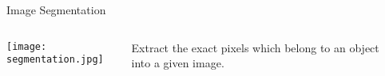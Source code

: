 \documentclass{standalone}
\begin{document}
\begin{frame}
\begin{columns}
\begin{column}{0.5\textwidth}
    \end{column}
    \begin{column}{0.5\textwidth}
      \begin{alertblock}{Image Segmentation}
        \begin{columns}
          \begin{column}{0.5\textwidth}
            \hspace*{0.19cm}
            \texttt{[image: segmentation.jpg]}
          \end{column}
          \begin{column}{0.42\textwidth}
            Extract the exact pixels which belong to an object into a given image.
          \end{column}
        \end{columns}
      \end{alertblock}
    \end{column}
  \end{columns}

\end{frame}
\end{document}
